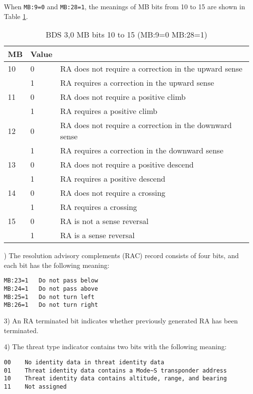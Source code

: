 When \texttt{MB:9=0} and \texttt{MB:28=1}, the meanings of MB bits from 10 to 15 are shown in Table \ref{tb:bds30_mb10-22_2}.

\begin{table}[]
\centering
\caption{BDS 3,0 MB bits 10 to 15 (MB:9=0 MB:28=1)}
\label{tb:bds30_mb10-22_2}
\begin{tabular}{|l|l|l|}
\hline
\textbf{MB} & \textbf{Value} & \textbf{} \\ \hline
10 & 0 & RA does not require a correction in the upward sense \\ \hline
 & 1 & RA requires a correction in the upward sense \\ \hline
11 & 0 & RA does not require a positive climb \\ \hline
 & 1 & RA requires a positive climb \\ \hline
12 & 0 & RA does not require a correction in the downward sense \\ \hline
 & 1 & RA requires a correction in the downward sense \\ \hline
13 & 0 & RA does not require a positive descend \\ \hline
 & 1 & RA requires a positive descend \\ \hline
14 & 0 & RA does not require a crossing \\ \hline
 & 1 & RA requires a crossing \\ \hline
15 & 0 & RA is not a sense reversal \\ \hline
 & 1 & RA is a sense reversal \\ \hline
\end{tabular}
\end{table}

) The resolution advisory complements (RAC) record consists of four bits, and each bit has the following meaning:

\begin{verbatim}
MB:23=1   Do not pass below
MB:24=1   Do not pass above
MB:25=1   Do not turn left
MB:26=1   Do not turn right
\end{verbatim}


3) An RA terminated bit indicates whether previously generated RA has been terminated.


4) The threat type indicator contains two bits with the following meaning:

\begin{verbatim}
00    No identity data in threat identity data
01    Threat identity data contains a Mode~S transponder address
10    Threat identity data contains altitude, range, and bearing
11    Not assigned
\end{verbatim}


